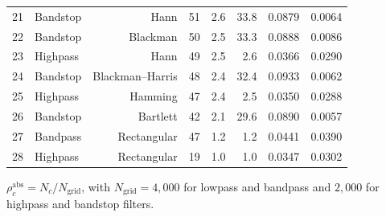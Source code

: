 \documentclass[journal]{IEEEtran}
\begin{document}
\begin{table}[!t]
\begin{tabular}{rlrrrrrr}
21 & Bandstop & Hann & 51 & 2.6 & 33.8 & 0.0879 & 0.0064 \\
22 & Bandstop & Blackman & 50 & 2.5 & 33.3 & 0.0888 & 0.0086 \\
23 & Highpass & Hann & 49 & 2.5 & 2.6 & 0.0366 & 0.0290 \\
24 & Bandstop & Blackman--Harris & 48 & 2.4 & 32.4 & 0.0933 & 0.0062 \\
25 & Highpass & Hamming & 47 & 2.4 & 2.5 & 0.0350 & 0.0288 \\
26 & Bandstop & Bartlett & 42 & 2.1 & 29.6 & 0.0890 & 0.0057 \\
27 & Bandpass & Rectangular & 47 & 1.2 & 1.2 & 0.0441 & 0.0390 \\
28 & Highpass & Rectangular & 19 & 1.0 & 1.0 & 0.0347 & 0.0302 \\
\bottomrule
\end{tabular}

\vspace{2pt}
{\footnotesize $\rho_c^{\mathrm{abs}}=N_c/N_{\mathrm{grid}}$, with
$N_{\mathrm{grid}}=4{,}000$ for lowpass and bandpass and $2{,}000$ for
highpass and bandstop filters.}
\end{table}
\end{document}
